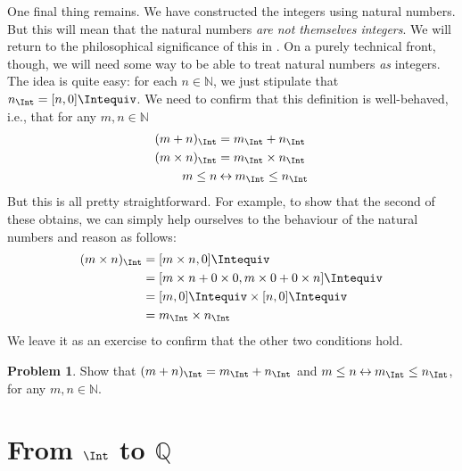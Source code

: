 \documentclass[10pt,a4paper]{article}
\makeatletter
\theoremstyle{plain}
\theoremstyle{definition}
\newtheorem{prob}{Problem}[section]
\theoremstyle{remark}
\newcommand*{\olfileid}[3]{}
\newcommand*{\olsection}[1]{\section*{#1}}
\newcommand{\olref}{\@ifnextchar[{\olref@i}{\olref@final}}
\def\olref@i[#1]{\@ifnextchar[{\olref@ii}{\olref@final}}
\def\olref@ii[#1]{\@ifnextchar[{\olref@iii}{\olref@final}}
\def\olref@iii[#1]{\olref@final}
\def\olref@final#1{\ref{#1}}
\providecommand{\Nat}{\ensuremath{\mathbb{N}}}
\providecommand{\equivrep}[1]{[#1]}
\providecommand{\Rat}{\mathbb{Q}}
\providecommand{\liff}{\mathbin{\leftrightarrow}}
\makeatother
\begin{document}
One final thing remains. We have constructed the integers using
natural numbers. But this will mean that the natural numbers \emph{are
not themselves integers}. We will return to the philosophical
significance of this in \olref[ref]{sec}. On a purely technical front,
though, we will need some way to be able to treat natural numbers
\emph{as} integers. The idea is quite easy: for each $n \in \Nat$, we
just stipulate that $n_\Int = \equivrep{n, 0}{\Intequiv}$. We need to
confirm that this definition is well-behaved, i.e., that for any $m, n
\in \Nat$
\begin{align*}
	(m + n)_\Int &= m_\Int + n_\Int\\
	(m \times n)_\Int &= m_\Int \times n_\Int\\
	m \leq n &\liff m_\Int \leq n_\Int
\end{align*}
But this is all pretty straightforward. For example, to show that the
second of these obtains, we can simply help ourselves to the behaviour
of the natural numbers and reason as follows:
	\begin{align*}
		(m \times n)_\Int  &= \equivrep{m \times n, 0}{\Intequiv} \\
		&= \equivrep{m \times n + 0 \times 0, m \times 0 + 0 \times n}{\Intequiv} \\
		&= \equivrep{m, 0}{\Intequiv} \times \equivrep{n, 0}{\Intequiv} \\
		&= m_\Int \times n_\Int
	\end{align*}
We leave it as an exercise to confirm that the other two conditions hold.
\begin{prob}
	Show that $(m + n)_\Int = m_\Int + n_\Int$ and $m \leq n \liff m_\Int \leq n_\Int$, for any $m, n \in \Nat$.
\end{prob}




\olfileid{sfr}{arith}{rat}
\olsection{From $\Int$ to $\Rat$}
\end{document}
